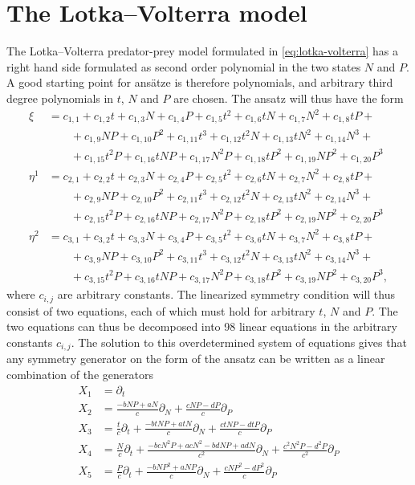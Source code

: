 \section{The Lotka--Volterra model}

The Lotka--Volterra predator-prey model formulated in \cref{eq:lotka-volterra} has a right hand side formulated as second order polynomial in the two states \(N\) and \(P\).
A good starting point for ansätze is therefore polynomials, and arbitrary third degree polynomials in \(t\), \(N\) and \(P\) are chosen.
The ansatz will thus have the form
\begin{align*}
  \xi &= c_{1,1} + c_{1,2}t + c_{1,3}N + c_{1,4}P + c_{1,5}t^{2} + c_{1,6}tN + c_{1,7}N^{2} + c_{1,8}tP + \\ & \qquad + c_{1,9}NP + c_{1,10}P^{2} + c_{1,11}t^{3} + c_{1,12}t^{2}N + c_{1,13}tN^{2} + c_{1,14}N^{3} + \\ & \qquad + c_{1,15}t^{2}P + c_{1,16}tNP + c_{1,17}N^{2}P + c_{1,18}tP^{2} + c_{1,19}NP^{2} + c_{1,20}P^{3} \\
  \eta^{1} &= c_{2,1} + c_{2,2}t + c_{2,3}N + c_{2,4}P + c_{2,5}t^{2} + c_{2,6}tN + c_{2,7}N^{2} + c_{2,8}tP + \\ & \qquad + c_{2,9}NP + c_{2,10}P^{2} + c_{2,11}t^{3} + c_{2,12}t^{2}N + c_{2,13}tN^{2} + c_{2,14}N^{3} + \\ & \qquad + c_{2,15}t^{2}P + c_{2,16}tNP + c_{2,17}N^{2}P + c_{2,18}tP^{2} + c_{2,19}NP^{2} + c_{2,20}P^{3} \\
  \eta^{2} &= c_{3,1} + c_{3,2}t + c_{3,3}N + c_{3,4}P + c_{3,5}t^{2} + c_{3,6}tN + c_{3,7}N^{2} + c_{3,8}tP + \\ & \qquad + c_{3,9}NP + c_{3,10}P^{2} + c_{3,11}t^{3} + c_{3,12}t^{2}N + c_{3,13}tN^{2} + c_{3,14}N^{3} + \\ & \qquad + c_{3,15}t^{2}P + c_{3,16}tNP + c_{3,17}N^{2}P + c_{3,18}tP^{2} + c_{3,19}NP^{2} + c_{3,20}P^{3},
\end{align*}
where \(c_{i,j}\) are arbitrary constants.
The linearized symmetry condition will thus consist of two equations, each of which must hold for arbitrary \(t\), \(N\) and \(P\).
The two equations can thus be decomposed into 98 linear equations in the arbitrary constants \(c_{i,j}\).
The solution to this overdetermined system of equations gives that any symmetry generator on the form of the ansatz can be written as a linear combination of the generators
\begin{align*}
  X_1 &= \partial_t \\
  X_2 &= \frac{-bNP + aN}{c} \partial_N + \frac{cNP - dP}{c} \partial_P \\
  X_3 &= \frac{t}{c} \partial_t + \frac{-btNP + atN}{c} \partial_N + \frac{ctNP - dtP}{c} \partial_P \\
  X_4 &= \frac{N}{c} \partial_t + \frac{-bcN^2P + acN^2 - bdNP + adN}{c^2} \partial_N + \frac{c^2N^2P - d^2P}{c^2} \partial_P \\
  X_5 &= \frac{P}{c} \partial_t + \frac{-bNP^2 + aNP}{c} \partial_N + \frac{cNP^2 - dP^2}{c} \partial_P
\end{align*}


